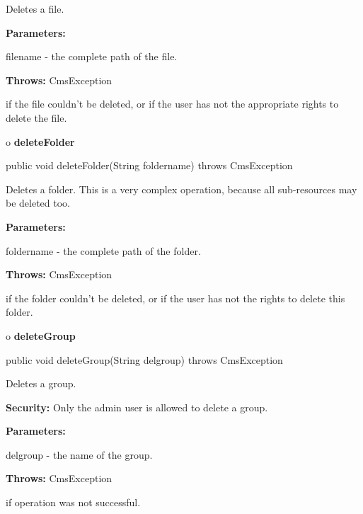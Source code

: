 \begin{description}
\htmlDD Deletes a file. 

\begin{description}
\item {\bf Parameters:}  

filename - the complete path of the file.  
\item {\bf Throws:} CmsException  

if the file couldn't be deleted, or if the user has not the appropriate rights
to delete the file.  
\end{description}

\end{description}

o {\bf deleteFolder} 

\begin{PRE}
 public void deleteFolder(String foldername) throws CmsException
\end{PRE}

\begin{description}
\htmlDD Deletes a folder. \htmlBR
This is a very complex operation, because all sub-resources may be deleted
too. 

\begin{description}
\item {\bf Parameters:}  

foldername - the complete path of the folder.  
\item {\bf Throws:} CmsException  

if the folder couldn't be deleted, or if the user has not the rights to delete
this folder.  
\end{description}

\end{description}

o {\bf deleteGroup} 

\begin{PRE}
 public void deleteGroup(String delgroup) throws CmsException
\end{PRE}

\begin{description}
\htmlDD Deletes a group. 

{\bf Security:} Only the admin user is allowed to delete a group. 

\begin{description}
\item {\bf Parameters:}  

delgroup - the name of the group.  
\item {\bf Throws:} CmsException  

if operation was not successful.  
\end{description}

\end{description}

